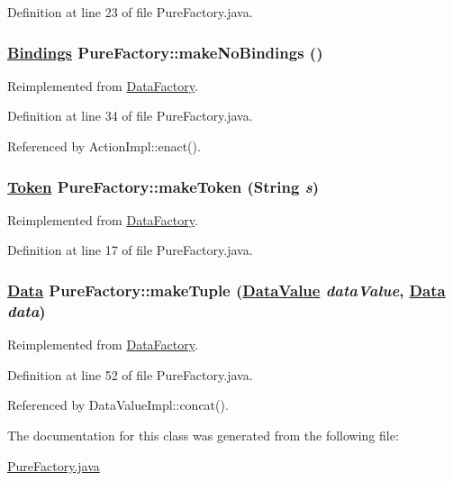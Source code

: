 Definition at line 23 of file Pure\-Factory.java.\hypertarget{classPureFactory_a7}{
\subsubsection[makeNoBindings]{\setlength{\rightskip}{0pt plus 5cm}\hyperlink{interfaceBindings}{Bindings} Pure\-Factory::make\-No\-Bindings ()}}
\label{classPureFactory_a7}




Reimplemented from \hyperlink{interfaceDataFactory_a9}{Data\-Factory}.

Definition at line 34 of file Pure\-Factory.java.

Referenced by Action\-Impl::enact().

\hypertarget{classPureFactory_a2}{
\subsubsection[makeToken]{\setlength{\rightskip}{0pt plus 5cm}\hyperlink{interfaceToken}{Token} Pure\-Factory::make\-Token (String {\em s})}}
\label{classPureFactory_a2}




Reimplemented from \hyperlink{interfaceDataFactory_a3}{Data\-Factory}.

Definition at line 17 of file Pure\-Factory.java.\hypertarget{classPureFactory_a12}{
\subsubsection[makeTuple]{\setlength{\rightskip}{0pt plus 5cm}\hyperlink{interfaceData}{Data} Pure\-Factory::make\-Tuple (\hyperlink{interfaceDataValue}{Data\-Value} {\em data\-Value}, \hyperlink{interfaceData}{Data} {\em data})}}
\label{classPureFactory_a12}




Reimplemented from \hyperlink{interfaceDataFactory_a1}{Data\-Factory}.

Definition at line 52 of file Pure\-Factory.java.

Referenced by Data\-Value\-Impl::concat().



The documentation for this class was generated from the following file:\begin{CompactItemize}
\item 
\hyperlink{PureFactory_8java-source}{Pure\-Factory.java}\end{CompactItemize}
